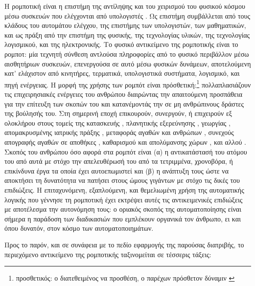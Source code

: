 Η ρομποτική είναι η επιστήμη της αντίληψης και του χειρισμού του φυσικού κόσμου
μέσω συσκευών που ελέγχονται από υπολογιστές \cite{thrun2005probabilistic}.  Ως
επιστήμη συμβάλλεται από τους κλάδους του αυτομάτου ελέγχου, της επιστήμης των
υπολογιστών, των μαθηματικών, και ως πράξη από την επιστήμη της φυσικής, της
τεχνολογίας υλικών, της τεχνολογίας λογισμικού, και της ηλεκτρονικής. Το φυσικό
αντικείμενο της ρομποτικής είναι το ρομποτ: μία τεχνητή σύνθεση αντλούσα
πληροφορίες από το φυσικό περιβάλλον μέσω αισθητήριων συσκευών, επενεργούσα σε
αυτό μέσω φυσικών δυνάμεων, αποτελούμενη κατ' ελάχιστον από κινητήρες,
τερματικά, υπολογιστικά συστήματα, λογισμικό, και πηγή ενέργειας. Η μορφή της
χρήσης των ρομπότ είναι πρόσθετική:\footnote{προσθετικός: ο διατεθειμένος να
προσθέση, ο παρέχων πρόσθετον δύναμιν \cite{liddell_scott}} πολλαπλασιάζουν τις
επιχειρησιακές ενέργειες του ανθρώπου διαιρώντας την απαιτούμενη προσπάθεια για
την επίτευξη των σκοπών του και κατανέμοντάς την σε μη ανθρώπινους δράστες της
βούλησής του.  Στη σημερινή εποχή επικουρούν, συνεργούν, ή επιχειρούν εξ
ολοκλήρου στους τομείς της κατασκευής \cite{Wang2019}, πλανητικής εξερεύνησης
\cite{Williford2018}, γεωργίας \cite{Vasconez2019,Noguchi2011}, απομακρυσμένης
ιατρικής πράξης \cite{Sheetz2020}, μεταφοράς αγαθών και ανθρώπων
\cite{Dikmen2016,Lima2018,Simpson2019}, συνεχούς απογραφής αγαθών σε αποθήκες
\cite{Dimitriou2021}, καθαρισμού και απολύμανσης χώρων \cite{Khan2020}, και
αλλού \cite{security_robots,hotel_robots,Chen2021,Nicholson2008}.  Σκοπός του
ανθρώπου όσο αφορά στα ρομπότ είναι (α) η αντικατάστασή του ατόμου του από αυτά
με στόχο την απελευθέρωσή του από τα τετριμμένα, χρονοβόρα, ή επικίνδυνα έργα
τα οποία έχει αυτοεπωμιστεί και (β) η ανάπτυξη τους ώστε να αποκτήσει τη
δυνατότητα να πατήσει στους ώμους γιγάντων με στόχο τις δικές του επιδιώξεις. Η
επιταχυνόμενη, εξαπλούμενη, και θεμελιωμένη χρήση της αυτοματικής λογικής που
γέννησε τη ρομποτική έχει εκτρέψει αυτές τις αντικειμενικές επιδιώξεις με
αποτέλεσμα την αυτονόμηση τους: ο οριακός σκοπός της αυτοματοποίησης είναι
σήμερα η παράδοση των διαδικασιών που εμπλέκουν οργανικά τον άνθρωπο, ει και
όπου δυνατόν, στον κόσμο των αυτοματοποιημάτων.

Προς το παρόν, και σε συνάφεια με το πεδίο εφαρμογής της παρούσας διατριβής,
το περιεχόμενο αντικείμενο της ρομποτικής ταξινομείται σε τέσσερις τάξεις:

